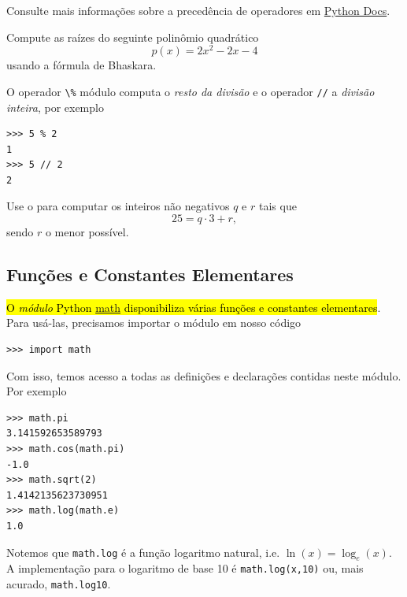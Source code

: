 \documentclass[12pt]{article}
\begin{document}
\begin{obs}
Consulte mais informações sobre a precedência de operadores em \href{https://docs.python.org/3/reference/expressions.html#operator-precedence}{Python Docs}.
\end{obs}

\begin{exr}\label{exr:bhaskara}
  Compute as raízes do seguinte polinômio quadrático
  \begin{equation}
    p(x) = 2x^2 - 2x - 4
  \end{equation}
  usando a fórmula de Bhaskara{\bhaskara}.
\end{exr}

O operador \lstinline+\%+ módulo computa o \emph{resto da divisão} e o operador \lstinline+//+ a \emph{divisão inteira}, por exemplo

\begin{lstlisting}
>>> 5 % 2
1
>>> 5 // 2
2
\end{lstlisting}

\begin{exr}
  Use o {\python} para computar os inteiros não negativos $q$ e $r$ tais que
  \begin{equation}
    25 = q\cdot 3 + r,
  \end{equation}
  sendo $r$ o menor possível.
\end{exr}

\subsection{Funções e Constantes Elementares}

\hl{O \emph{módulo} Python {\href{https://docs.python.org/3/library/math.html}{math}} disponibiliza várias funções e constantes elementares}. Para usá-las, precisamos importar o módulo em nosso código

\begin{lstlisting}
>>> import math
\end{lstlisting}

Com isso, temos acesso a todas as definições e declarações contidas neste módulo. Por exemplo

\begin{lstlisting}
>>> math.pi
3.141592653589793
>>> math.cos(math.pi)
-1.0
>>> math.sqrt(2)
1.4142135623730951
>>> math.log(math.e)
1.0
\end{lstlisting}

\begin{obs}
  Notemos que \lstinline+math.log+ é a função logaritmo natural, i.e. $\ln(x) = \log_e(x)$. A implementação {\python} para o logaritmo de base 10 é \lstinline+math.log(x,10)+ ou, mais acurado, \lstinline+math.log10+.
\end{obs}
\end{document}
